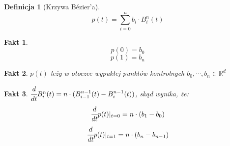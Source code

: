 \documentclass[hidelinks,a4paper,fleqn,oneside]{book}
\newcommand{\RR}{\mathbb{R}}
\newtheorem{defi}{Definicja}
\newtheorem{fakt}{Fakt}
\begin{document}
\begin{defi}[Krzywa Bézier'a]
	\[
		p(t) = \sum_{i=0}^n b_i \cdot B_i^n(t)
	\]
\end{defi}

\begin{fakt}
	\[
		p(0) = b_0
	\]
	\[
		p(1) = b_n
	\]
\end{fakt}

\begin{fakt}
	$p(t)$ leży w otoczce wypukłej punktów kontrolnych $b_0, \cdots, b_n \in \RR^d$
\end{fakt}

\begin{fakt}
	$\cfrac{d}{dt} B_i^n(t) = n \cdot (B_{i-1}^{n-1}(t) - B_i^{n-1}(t))$, skąd wynika, że:
	\[
		\cfrac{d}{dt} p(t)|_{t=0} = n \cdot (b_1 - b_0)
	\]
	\[
		\cfrac{d}{dt} p(t)|_{t=1} = n \cdot (b_n - b_{n-1})
	\]
\end{fakt}


\printindex
\end{document}
